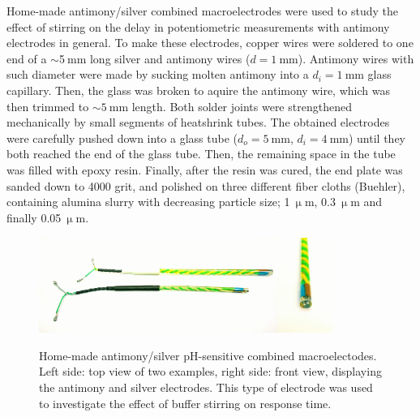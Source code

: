 Home-made antimony/silver combined macroelectrodes were used to study the effect of stirring on the delay in potentiometric measurements with antimony electrodes in general.
To make these electrodes, copper wires were soldered to one end of a $\sim$5$~$mm long silver and antimony wires ($d = 1~$mm).
Antimony wires with such diameter were made by sucking molten antimony into a $d_i = 1~$mm glass capillary.
Then, the glass was broken to aquire the antimony wire, which was then trimmed to $\sim 5~$mm length.
Both solder joints were strengthened mechanically by small segments of heatshrink tubes.
The obtained electrodes were carefully pushed down into a glass tube ($d_o = 5~$mm, $d_i=4~$mm) until they both reached the end of the glass tube.
Then, the remaining space in the tube was filled with epoxy resin.
Finally, after the resin was cured, the end plate was sanded down to 4000 grit, and polished on three different fiber cloths (Buehler), containing alumina slurry with decreasing particle size; 1$~\upmu$m, 0.3$~\upmu$m and finally 0.05$~\upmu$m.

\begin{figure}
\centering
\includegraphics[width=0.693\textwidth]{img/sb_ag_top.jpg}\includegraphics[width=0.165\textwidth]{img/sb_ag_front.jpg}
\caption[Home-made antimony/silver pH-sensitive combined macroelectrodes.]{Home-made antimony/silver pH-sensitive combined macroelectodes.
Left side: top view of two examples, right side: front view, displaying the antimony and silver electrodes. This type of electrode was used to investigate the effect of buffer stirring on response time.}
\label{fig:sb_macro}
\end{figure}

